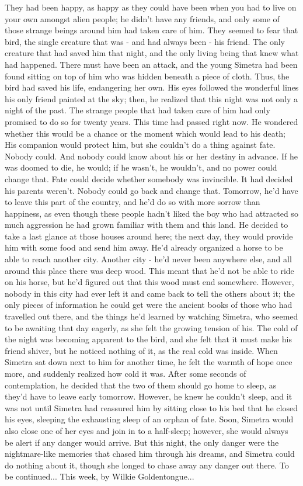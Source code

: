 They had been happy, as happy as they could have been when you had to live on your own amongst alien people; he didn't have any friends, and only some of those strange beings around him had taken care of him. They seemed to fear that bird, the single creature that was - and had always been - his friend. 
The only creature that had saved him that night, and the only living being that knew what had happened. There must have been an attack, and the young Simetra had been found sitting on top of him who was hidden beneath a piece of cloth. Thus, the bird had saved his life, endangering her own. 
His eyes followed the wonderful lines his only friend painted at the sky; then, he realized that this night was not only a night of the past. 
The strange people that had taken care of him had only promised to do so for twenty years. 
This time had passed right now. 
He wondered whether this would be a chance or the moment which would lead to his death; His companion would protect him, but she couldn't do a thing against fate. 
Nobody could. 
And nobody could know about his or her destiny in advance. 
If he was doomed to die, he would; if he wasn't, he wouldn't, and no power could change that. 
Fate could decide whether somebody was invincible. It had decided his parents weren't. 
Nobody could go back and change that. 
Tomorrow, he'd have to leave this part of the country, and he'd do so with more sorrow than happiness, as even though these people hadn't liked the boy who had attracted so much aggression he had grown familiar with them and this land. 
He decided to take a last glance at those houses around here; the next day, they would provide him with some food and send him away. He'd already organized a horse to be able to reach another city. 
Another city - he'd never been anywhere else, and all around this place there was deep wood. This meant that he'd not be able to ride on his horse, but he'd figured out that this wood must end somewhere. However, nobody in this city had ever left it and came back to tell the others about it; the only pieces of information he could get were the ancient books of those who had travelled out there, and the things he'd learned by watching Simetra, who seemed to be awaiting that day eagerly, as she felt the growing tension of his. 
The cold of the night was becoming apparent to the bird, and she felt that it must make his friend shiver, but he noticed nothing of it, as the real cold was inside. When Simetra sat down next to him for another time, he felt the warmth of hope once more, and suddenly realized how cold it was. After some seconds of contemplation, he decided that the two of them should go home to sleep, as they'd have to leave early tomorrow. 
However, he knew he couldn't sleep, and it was not until Simetra had reassured him by sitting close to his bed that he closed his eyes, sleeping the exhausting sleep of an orphan of fate. 
Soon, Simetra would also close one of her eyes and join in to a half-sleep; however, she would always be alert if any danger would arrive. 
But this night, the only danger were the nightmare-like memories that chased him through his dreams, and Simetra could do nothing about it, though she longed to chase away any danger out there. 
To be continued...
This week, by Wilkie Goldentongue...

